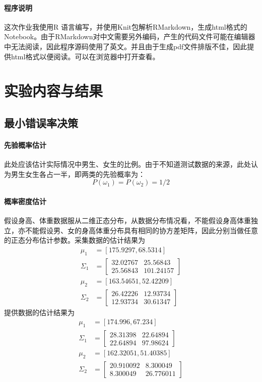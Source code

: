 	\paragraph{程序说明} 这次作业我使用{\ttfamily R} 语言编写，并使用{\ttfamily Knit}包解析{\ttfamily RMarkdown}，生成{\ttfamily html}格式的{\ttfamily Notebook}。由于{\ttfamily RMarkdown}对中文需要另外编码，产生的代码文件可能在编辑器中无法阅读，因此程序源码使用了英文。并且由于生成{\ttfamily pdf}文件排版不佳，因此提供{\ttfamily html}格式以便阅读。可以在浏览器中打开查看。

\section{实验内容与结果}
\subsection{最小错误率决策}
	\paragraph{先验概率估计} 此处应该估计实际情况中男生、女生的比例。由于不知道测试数据的来源，此处认为男生女生各占一半，即两类的先验概率为：
	\begin{equation}
		P(\omega_1)=P(\omega_2)=1/2
	\end{equation}
	\paragraph{概率密度估计} 假设身高、体重数据服从二维正态分布，从数据分布情况看，不能假设身高体重独立，亦不能假设男、女的身高体重分布具有相同的协方差矩阵，因此分别当做任意的正态分布估计参数。采集数据的估计结果为
	\begin{align}
		\mu_1 &= [175.9297,68.5314]\\
		\Sigma_1 &= \begin{bmatrix}
		32.02767 & 25.56843 \\
		25.56843 & 101.24157
		\end{bmatrix}\\
		\mu_2 &= [163.54651,52.42209]\\
		\Sigma_2 &= \begin{bmatrix}
		26.42226 & 12.93734 \\
		12.93734 & 30.61347
		\end{bmatrix}
	\end{align}
	提供数据的估计结果为
	\begin{align}
		\mu_1 &= [174.996,67.234]\\
		\Sigma_1 &= \begin{bmatrix}
		28.31398 & 22.64894 \\
		22.64894 & 97.98624
		\end{bmatrix}\\
		\mu_2 &= [162.32051,51.40385]\\
		\Sigma_2 &= \begin{bmatrix}
		20.910092 & 8.300049 \\
		8.300049 & 26.776011
		\end{bmatrix}
	\end{align}
